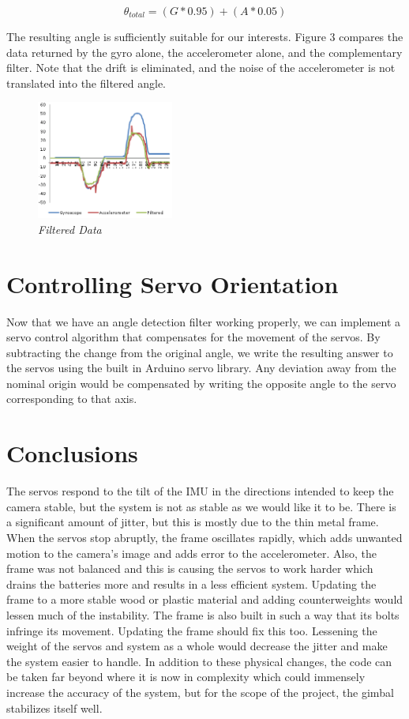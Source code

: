 \documentclass{IEEEtran}
\begin{document}
\begin{equation} 
\label{filter}
\theta_{total} = (G * 0.95) + (A * 0.05)
\end{equation}

The resulting angle is sufficiently suitable for our interests. Figure 3 compares the data returned by the gyro alone, the accelerometer alone, and the complementary filter. Note that the drift is eliminated, and the noise of the accelerometer is not translated into the filtered angle.


\begin{figure}[ht!]
\centering
\label{chart2}
\includegraphics[width=0.4\textwidth]{david}
\caption{\emph{Filtered Data}}
\end{figure}


\section{Controlling Servo Orientation}
Now that we have an angle detection filter working properly, we can implement a servo control algorithm that compensates for the movement of the servos. By subtracting the change from the original angle, we write the resulting answer to the servos using the built in Arduino servo library. Any deviation away from the nominal origin would be compensated by writing the opposite angle to the servo corresponding to that axis.

\section{Conclusions}
The servos respond to the tilt of the IMU in the directions intended to keep the camera stable, but the system is not as stable as we would like it to be. There is a significant amount of jitter, but this is mostly due to the thin metal frame. When the servos stop abruptly, the frame oscillates rapidly, which adds unwanted motion to the camera's image and adds error to the accelerometer. Also, the frame was not balanced and this is causing the servos to work harder which drains the batteries more and results in a less efficient system. Updating the frame to a more stable wood or plastic material and adding counterweights would lessen much of the instability. The frame is also built in such a way that its bolts infringe its movement. Updating the frame should fix this too. Lessening the weight of the servos and system as a whole would decrease the jitter and make the system easier to handle. 
In addition to these physical changes, the code can be taken far beyond where it is now in complexity which could immensely increase the accuracy of the system, but for the scope of the project, the gimbal stabilizes itself well.
\end{document}
